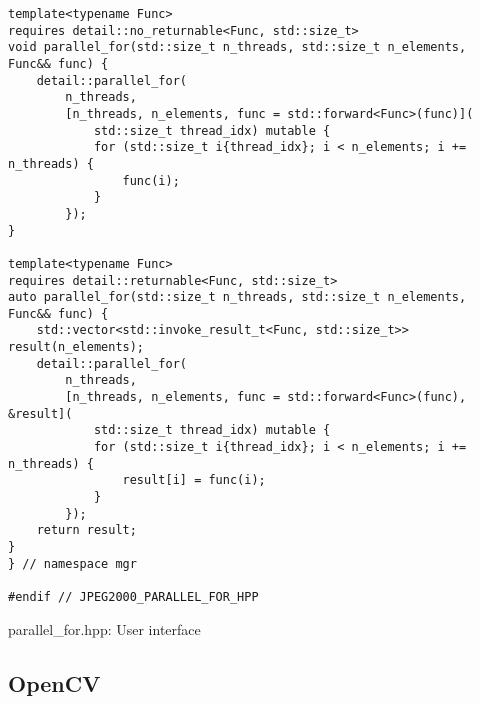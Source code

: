 \begin{listing}[htb]
\begin{verbatim}
template<typename Func>
requires detail::no_returnable<Func, std::size_t>
void parallel_for(std::size_t n_threads, std::size_t n_elements, Func&& func) {
    detail::parallel_for(
        n_threads,
        [n_threads, n_elements, func = std::forward<Func>(func)](
            std::size_t thread_idx) mutable {
            for (std::size_t i{thread_idx}; i < n_elements; i += n_threads) {
                func(i);
            }
        });
}

template<typename Func>
requires detail::returnable<Func, std::size_t>
auto parallel_for(std::size_t n_threads, std::size_t n_elements, Func&& func) {
    std::vector<std::invoke_result_t<Func, std::size_t>> result(n_elements);
    detail::parallel_for(
        n_threads,
        [n_threads, n_elements, func = std::forward<Func>(func), &result](
            std::size_t thread_idx) mutable {
            for (std::size_t i{thread_idx}; i < n_elements; i += n_threads) {
                result[i] = func(i);
            }
        });
    return result;
}
} // namespace mgr

#endif // JPEG2000_PARALLEL_FOR_HPP
\end{verbatim}
\caption{parallel\_for.hpp: User interface}
\label{lst:parallel_for_user_interface}
\end{listing}

\subsection{OpenCV}
